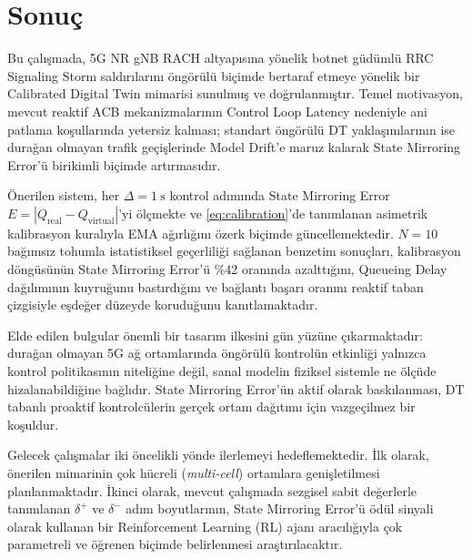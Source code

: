 \documentclass[conference]{IEEEtran}
\newcommand{\qreal}{Q_{\mathrm{real}}}
\newcommand{\qvirt}{Q_{\mathrm{virtual}}}
\begin{document}
\section{Sonuç}

Bu çalışmada, 5G NR gNB RACH altyapısına yönelik botnet güdümlü RRC Signaling
Storm saldırılarını öngörülü biçimde bertaraf etmeye yönelik bir Calibrated
Digital Twin mimarisi sunulmuş ve doğrulanmıştır. Temel motivasyon, mevcut
reaktif ACB mekanizmalarının Control Loop Latency nedeniyle ani patlama
koşullarında yetersiz kalması; standart öngörülü DT yaklaşımlarının ise durağan
olmayan trafik geçişlerinde Model Drift'e maruz kalarak State Mirroring
Error'ü birikimli biçimde artırmasıdır.

Önerilen sistem, her $\Delta = 1\ \mathrm{s}$ kontrol adımında State Mirroring
Error $E = |\qreal - \qvirt|$'yi ölçmekte ve \eqref{eq:calibration}'de
tanımlanan asimetrik kalibrasyon kuralıyla EMA ağırlığını özerk biçimde
güncellemektedir. $N = 10$ bağımsız tohumla istatistiksel geçerliliği sağlanan
benzetim sonuçları, kalibrasyon döngüsünün State Mirroring Error'ü \%42
oranında azalttığını, Queueing Delay dağılımının kuyruğunu bastırdığını ve
bağlantı başarı oranını reaktif taban çizgisiyle eşdeğer düzeyde koruduğunu
kanıtlamaktadır.

Elde edilen bulgular önemli bir tasarım ilkesini gün yüzüne çıkarmaktadır:
durağan olmayan 5G ağ ortamlarında öngörülü kontrolün etkinliği yalnızca kontrol
politikasının niteliğine değil, sanal modelin fiziksel sistemle ne ölçüde
hizalanabildiğine bağlıdır. State Mirroring Error'ün aktif olarak baskılanması,
DT tabanlı proaktif kontrolcülerin gerçek ortam dağıtımı için vazgeçilmez bir
koşuldur.

Gelecek çalışmalar iki öncelikli yönde ilerlemeyi hedeflemektedir. İlk olarak,
önerilen mimarinin çok hücreli (\emph{multi-cell}) ortamlara genişletilmesi
planlanmaktadır. İkinci olarak, mevcut çalışmada sezgisel sabit değerlerle
tanımlanan $\delta^{+}$ ve $\delta^{-}$ adım boyutlarının, State Mirroring
Error'ü ödül sinyali olarak kullanan bir Reinforcement Learning (RL) ajanı
aracılığıyla çok parametreli ve öğrenen biçimde belirlenmesi araştırılacaktır.

\end{document}
